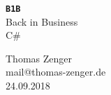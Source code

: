 \documentclass[a4paper, ngerman, 12pt]{scrreprt}
\begin{document}
\begin{titlepage}
\begin{center}
\vspace*{3cm}
\huge\textbf{\texttt{B1B}}\\
\vspace{1cm}
{\fontsize{50}{48} \selectfont Back in Business}\\
\vspace{0.5em}
{\fontsize{40}{48} \selectfont C\#}\\
\end{center}
\vspace{\fill}
\begin{large}
Thomas Zenger\\
mail@thomas-zenger.de\\
24.09.2018\\
\end{large}
\vspace{2cm}
\end{titlepage}


\pagestyle{fancy}
\tableofcontents
\listoffigures
\listoftables
\lstlistoflistings


\pagestyle{fancy}





%


\end{document}

